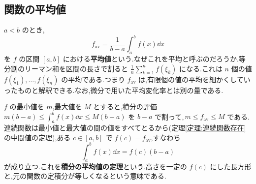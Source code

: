 \subsection{関数の平均値}
$a<b$ のとき,
\[
 f_{\mathrm{av}}=\frac1{b-a}\int_a^b f(x)\dd x
\]
を $f$ の区間 $[a,b]$ における\textbf{平均値}という.なぜこれを平均と呼ぶのだろうか.等分割のリーマン和を区間の長さで割ると $\frac1n\sum_{k=1}^{n}f(\xi_k)$ になる.これは $n$ 個の値 $f(\xi_1),\ldots,f(\xi_n)$ の平均である.つまり $f_{\mathrm{av}}$ は,有限個の値の平均を細かくしていったものと解釈できる.なお,微分で用いた平均変化率とは別の量である.

$f$ の最小値を $m$,最大値を $M$ とすると,積分の評価 $m(b-a)\le\int_a^b f(x)\dd x\le M(b-a)$ を $b-a$ で割って,\,$m\le f_{\mathrm{av}}\le M$ である.連続関数は最小値と最大値の間の値をすべてとるから(定理\ref{定理:連続関数存在}の中間値の定理),ある $c\in[a,b]$ で $f(c)=f_{\mathrm{av}}$,すなわち
\[
 \int_a^b f(x)\dd x=f(c)(b-a)
\]
が成り立つ.これを\textbf{積分の平均値の定理}という.高さを一定の $f(c)$ にした長方形と,元の関数の定積分が等しくなるという意味である.
